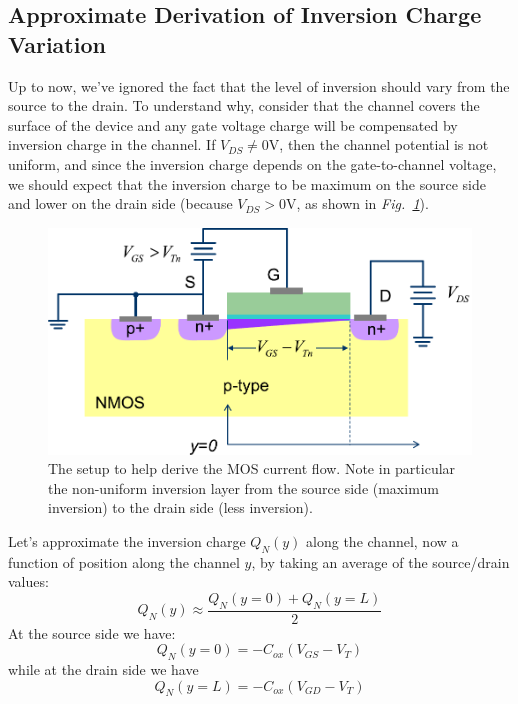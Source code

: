 \subsection{Approximate Derivation of Inversion Charge Variation}
Up to now, we've ignored the fact that the level of inversion should vary from the source to the drain.  To understand why, consider that the channel covers the surface of the device and any gate voltage charge will be compensated by inversion charge in the channel.  If $V_{DS} \ne 0$V, then the channel potential is not uniform, and since the inversion charge depends on the gate-to-channel voltage, we should expect that the inversion charge to be maximum on the source side and lower on the drain side (because $V_{DS} > 0$V, as shown in \emph{Fig.~\ref{fig:mos_current_derive}}).
\begin{figure}[tb]
\centering
\includegraphics[width=.75\columnwidth]{mos_current_derive}
\caption{The setup to help derive the MOS current flow.  Note in particular the non-uniform inversion layer from the source side (maximum inversion) to the drain side (less inversion).}
\label{fig:mos_current_derive}
\end{figure}
Let's approximate the  inversion charge $Q_N(y)$ along the channel, now a function of position along the channel $y$, by taking an average of the source/drain values:
    \begin{equation} 
        {Q_N}(y) \approx \frac{{Q_N}(y = 0) + {Q_N}(y = L)}{2} 
    \end{equation}
At the source side we have:
    \begin{equation} 
        {Q_N}(y = 0) =  - {C_{ox}}({V_{GS}} - {V_T}) 
    \end{equation}
while at the drain side we have
    \begin{equation} 
        {Q_N}(y = L) =  - {C_{ox}}({V_{GD}} - {V_T}) 
    \end{equation}
